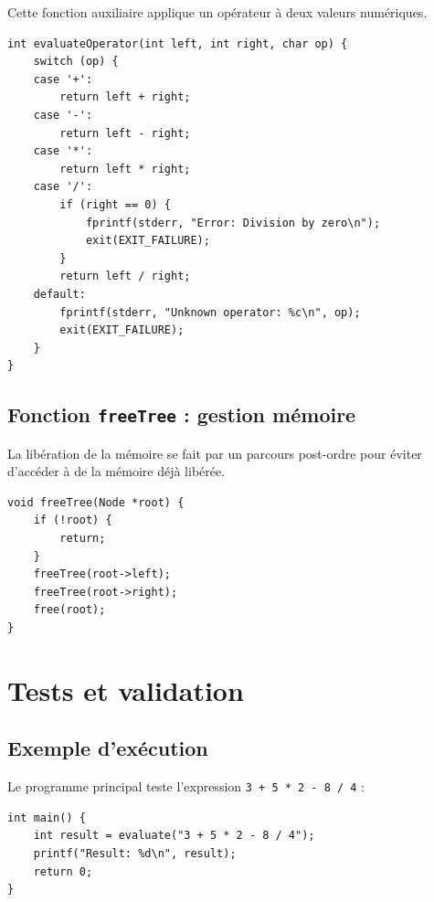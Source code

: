 \documentclass[12pt,a4paper]{article}
\begin{document}
Cette fonction auxiliaire applique un opérateur à deux valeurs numériques.

\begin{lstlisting}[caption={Application d'un opérateur arithmétique}]
int evaluateOperator(int left, int right, char op) {
    switch (op) {
    case '+':
        return left + right;
    case '-':
        return left - right;
    case '*':
        return left * right;
    case '/':
        if (right == 0) {
            fprintf(stderr, "Error: Division by zero\n");
            exit(EXIT_FAILURE);
        }
        return left / right;
    default:
        fprintf(stderr, "Unknown operator: %c\n", op);
        exit(EXIT_FAILURE);
    }
}
\end{lstlisting}

\subsection{Fonction \texttt{freeTree} : gestion mémoire}

La libération de la mémoire se fait par un parcours post-ordre pour éviter d'accéder à de la mémoire déjà libérée.

\begin{lstlisting}[caption={Libération récursive de l'arbre}]
void freeTree(Node *root) {
    if (!root) {
        return;
    }
    freeTree(root->left);
    freeTree(root->right);
    free(root);
}
\end{lstlisting}

\section{Tests et validation}

\subsection{Exemple d'exécution}

Le programme principal teste l'expression \texttt{3 + 5 * 2 - 8 / 4} :

\begin{lstlisting}[caption={Fonction main}]
int main() {
    int result = evaluate("3 + 5 * 2 - 8 / 4");
    printf("Result: %d\n", result);
    return 0;
}
\end{lstlisting}
\end{document}
